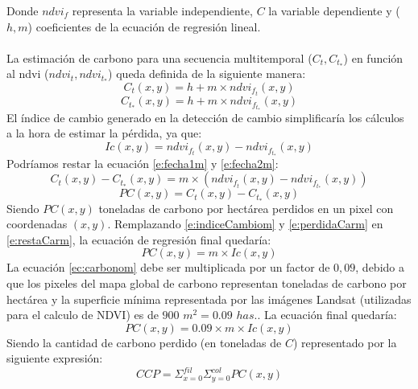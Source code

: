 Donde $ ndvi_{f} $ representa la variable independiente, $ C $ la variable dependiente y ($ h , m $) coeficientes de la ecuaci\'on de regresi\'on lineal. \\~\\
La estimaci\'on de carbono para una secuencia multitemporal ($ C_{t},C_{t_{*}} $) en funci\'on al ndvi ($ ndvi_{t},ndvi_{t_{*}} $) queda definida de la siguiente manera:
\begin{equation}
\label{e:fecha1m}
C_{t}(x,y)=h+m \times ndvi_{f_{t}}(x,y)
\end{equation}
\begin{equation}
\label{e:fecha2m}
C_{t_{*}}(x,y)=h+m \times ndvi_{f_{t_{*}}}(x,y)
\end{equation}
 El \'indice de cambio generado en la detecci\'on de cambio simplificar\'ia los c\'alculos a la hora de estimar la p\'erdida, ya que:
 \begin{equation}
 \label{e:indiceCambiom}
 Ic(x,y)=ndvi_{f_{t}}(x,y) - ndvi_{f_{t_{*}}}(x,y)
 \end{equation}		
 Podr\'iamos restar la ecuaci\'on \ref{e:fecha1m} y \ref{e:fecha2m}:
 \begin{equation}
 \label{e:restaCarm}
C_{t}(x,y) - C_{t_{*}}(x,y)= m \times (ndvi_{f_{t}}(x,y) - ndvi_{f_{t_{*}}}(x,y))
 \end{equation}		
 \begin{equation}
 \label{e:perdidaCarm}
 PC(x,y)= C_{t}(x,y) - C_{t_{*}}(x,y)
 \end{equation}		
 Siendo $ PC(x,y)$ toneladas de carbono por hect\'area perdidos en un pixel con coordenadas $ (x,y) $. Remplazando \ref{e:indiceCambiom} y \ref{e:perdidaCarm} en \ref{e:restaCarm}, la ecuaci\'on de regresi\'on final quedar\'ia:
 \begin{equation}\label{ec:carbonom}
 PC(x,y) = m \times Ic(x,y)
 \end{equation}
 La ecuaci\'on \ref{ec:carbonom} debe ser multiplicada por un factor de $ 0,09 $, debido a que los pixeles del mapa global de carbono representan toneladas de carbono por hect\'area \cite{saatchi2011benchmark} y la superficie m\'inima representada por las im\'agenes Landsat (utilizadas para el calculo de NDVI) es de $ 900$  $m^{2}=0.09 $  $has. $. La ecuaci\'on final quedar\'ia:
 \begin{equation}\label{ec:carbonoFinalm}
 PC(x,y) = 0.09 \times m \times Ic(x,y)
 \end{equation}
 Siendo la cantidad de carbono perdido (en toneladas de $ C $) representado por la siguiente expresi\'on:
 \begin{equation}\label{ec:carbonoFinalsumatoriam}
 CCP = \Sigma_{x=0}^{fil}\Sigma_{y=0}^{col} PC(x,y)
 \end{equation}
  

